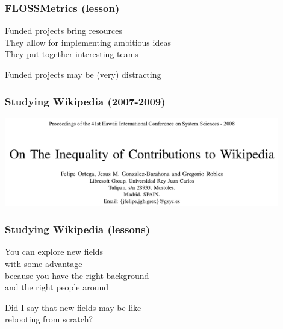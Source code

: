 \documentclass[17pt,aspectratio=169,hyperref=pdfusetitle]{beamer}
\begin{document}
\begin{frame}[fragile]
  \frametitle{FLOSSMetrics (lesson)}

  Funded projects bring resources \\
  They allow for implementing ambitious ideas \\
  They put together interesting teams \\
  
  \begin{center}
    Funded projects may be (very) distracting
  \end{center}  
  
\end{frame}

\begin{frame}[fragile]
  \frametitle{Studying Wikipedia (2007-2009)}

  \begin{center}
  \includegraphics[width=12cm]{figs/wikipedia}
  \end{center}  
  
\end{frame}

\begin{frame}[fragile]
  \frametitle{Studying Wikipedia (lessons)}

  You can explore new fields \\
  with some advantage \\
  because you have the right background \\
  and the right people around \\
  
  \begin{center}
    Did I say that new fields may be like \\
    rebooting from scratch? \\
  \end{center}  
  
\end{frame}
\end{document}
